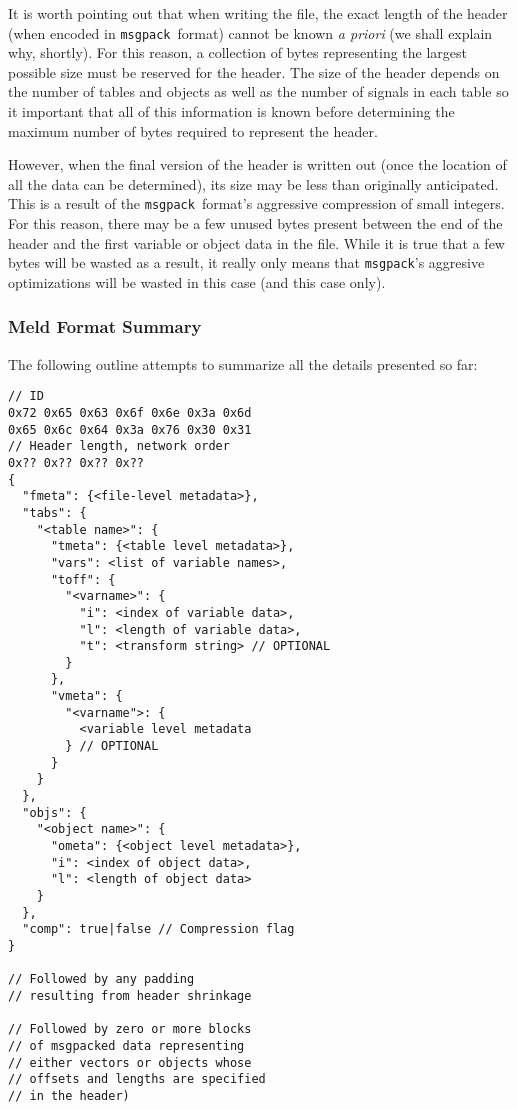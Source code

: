 \documentclass[11pt,a4paper,twocolumn]{article}
\newcommand{\msgpack}{\texttt{msgpack}}
\begin{document}
It is worth pointing out that when writing the file, the exact length
of the header (when encoded in \msgpack\ format) cannot be known
\textit{a priori} (we shall explain why, shortly).  For this reason, a
collection of bytes representing the largest possible size must be
reserved for the header.  The size of the header depends on the number
of tables and objects as well as the number of signals in each table
so it important that all of this information is known before
determining the maximum number of bytes required to represent the
header.

However, when the final version of the header is written out (once the
location of all the data can be determined), its size may be less than
originally anticipated.  This is a result of the \msgpack\ format's
aggressive compression of small integers.  For this reason, there may
be a few unused bytes present between the end of the header and the
first variable or object data in the file.  While it is true that a
few bytes will be wasted as a result, it really only means that
\msgpack's aggresive optimizations will be wasted in this case (and
this case only).

\subsubsection{Meld Format Summary}

The following outline attempts to summarize all the details presented so
far:

\begin{verbatim}
// ID
0x72 0x65 0x63 0x6f 0x6e 0x3a 0x6d
0x65 0x6c 0x64 0x3a 0x76 0x30 0x31
// Header length, network order
0x?? 0x?? 0x?? 0x??
{
  "fmeta": {<file-level metadata>},
  "tabs": {
    "<table name>": {
      "tmeta": {<table level metadata>},
      "vars": <list of variable names>,
      "toff": {
        "<varname>": {
          "i": <index of variable data>,
          "l": <length of variable data>,
          "t": <transform string> // OPTIONAL
        }
      },
      "vmeta": {
        "<varname">: {
          <variable level metadata
        } // OPTIONAL
      }
    }
  },
  "objs": {
    "<object name>": {
      "ometa": {<object level metadata>},
      "i": <index of object data>,
      "l": <length of object data>
    }
  },
  "comp": true|false // Compression flag
}

// Followed by any padding
// resulting from header shrinkage

// Followed by zero or more blocks
// of msgpacked data representing
// either vectors or objects whose
// offsets and lengths are specified
// in the header)
\end{verbatim}
\end{document}
